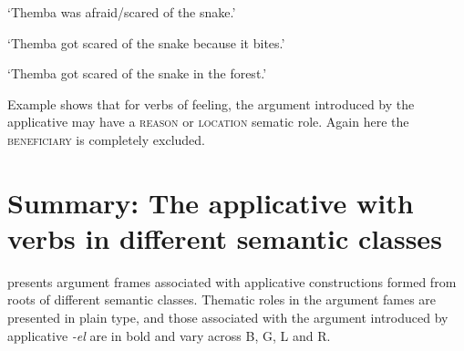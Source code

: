 \documentclass[output=paper]{langsci/langscibook}
\begin{document}
\glt ‘Themba was afraid/scared of the snake.’


\glt ‘Themba got scared of the snake because it bites.’


\glt ‘Themba got scared of the snake in the forest.’
\z
\z

Example  shows that for verbs of feeling, the argument introduced by the applicative may have a \textsc{reason} or \textsc{location} sematic role. Again here the \textsc{beneficiary} is completely excluded. 

\section{Summary: The applicative with verbs in different semantic classes}\label{sec:sibanda:}

 presents argument frames associated with applicative constructions formed from roots of different semantic classes. Thematic roles in the argument fames are presented in plain type, and those associated with the argument introduced by applicative \textit{-el} are in bold and vary across B, G, L and R. 
\end{document}
